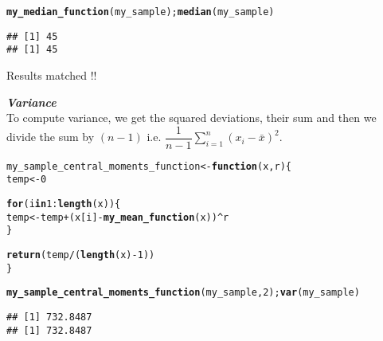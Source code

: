 \documentclass[11pt, a4paper]{article}\usepackage[]{graphicx}\usepackage[]{xcolor}
\makeatletter
\newcommand{\hlnum}[1]{\textcolor[rgb]{0.686,0.059,0.569}{#1}}%
\newcommand{\hlopt}[1]{\textcolor[rgb]{0,0,0}{#1}}%
\newcommand{\hldef}[1]{\textcolor[rgb]{0.345,0.345,0.345}{#1}}%
\newcommand{\hlkwa}[1]{\textcolor[rgb]{0.161,0.373,0.58}{\textbf{#1}}}%
\newcommand{\hlkwb}[1]{\textcolor[rgb]{0.69,0.353,0.396}{#1}}%
\newcommand{\hlkwc}[1]{\textcolor[rgb]{0.333,0.667,0.333}{#1}}%
\newcommand{\hlkwd}[1]{\textcolor[rgb]{0.737,0.353,0.396}{\textbf{#1}}}%
\newenvironment{kframe}{%
 \def\at@end@of@kframe{}%
 \ifinner\ifhmode%
  \def\at@end@of@kframe{\end{minipage}}%
  \begin{minipage}{\columnwidth}%
 \fi\fi%
 \def\FrameCommand##1{\hskip\@totalleftmargin \hskip-\fboxsep
 \colorbox{shadecolor}{##1}\hskip-\fboxsep
     \hskip-\linewidth \hskip-\@totalleftmargin \hskip\columnwidth}%
 \MakeFramed {\advance\hsize-\width
   \@totalleftmargin\z@ \linewidth\hsize
   \@setminipage}}%
 {\par\unskip\endMakeFramed%
 \at@end@of@kframe}
\newenvironment{knitrout}{}{} %
\makeatother
\begin{document}
\begin{knitrout}\footnotesize
{}\color{fgcolor}\begin{kframe}
\begin{alltt}
\hlkwd{my_median_function}\hldef{(my_sample);} \hlkwd{median}\hldef{(my_sample)}
\end{alltt}
\begin{verbatim}
## [1] 45
## [1] 45
\end{verbatim}
\end{kframe}
\end{knitrout}

\faCheckCircle[regular] Results matched !! \\

\vspace{1cm}

\faArrowAltCircleRight[regular] \textit{\textbf{Variance}} \\

To compute variance, we get the squared deviations, their sum and then we divide the sum by $(n-1)$ i.e. $\dfrac{1}{n-1} \sum \limits_{i = 1}^{n} (x_{i} - \bar{x})^2$.
\begin{knitrout}\footnotesize
{}\color{fgcolor}\begin{kframe}
\begin{alltt}
\hldef{my_sample_central_moments_function} \hlkwb{<-} \hlkwa{function}\hldef{(}\hlkwc{x}\hldef{,} \hlkwc{r}\hldef{)\{}
  \hldef{temp} \hlkwb{<-} \hlnum{0}

  \hlkwa{for} \hldef{(i} \hlkwa{in} \hlnum{1}\hlopt{:}\hlkwd{length}\hldef{(x)) \{}
    \hldef{temp} \hlkwb{<-} \hldef{temp} \hlopt{+} \hldef{(x[i]} \hlopt{-} \hlkwd{my_mean_function}\hldef{(x))}\hlopt{^}\hldef{r}
  \hldef{\}}

  \hlkwd{return}\hldef{(temp} \hlopt{/} \hldef{(}\hlkwd{length}\hldef{(x)} \hlopt{-} \hlnum{1}\hldef{))}
\hldef{\}}
\end{alltt}
\end{kframe}
\end{knitrout}

\begin{knitrout}\footnotesize
{}\color{fgcolor}\begin{kframe}
\begin{alltt}
\hlkwd{my_sample_central_moments_function}\hldef{(my_sample,} \hlnum{2}\hldef{);} \hlkwd{var}\hldef{(my_sample)}
\end{alltt}
\begin{verbatim}
## [1] 732.8487
## [1] 732.8487
\end{verbatim}
\end{kframe}
\end{knitrout}
\end{document}
